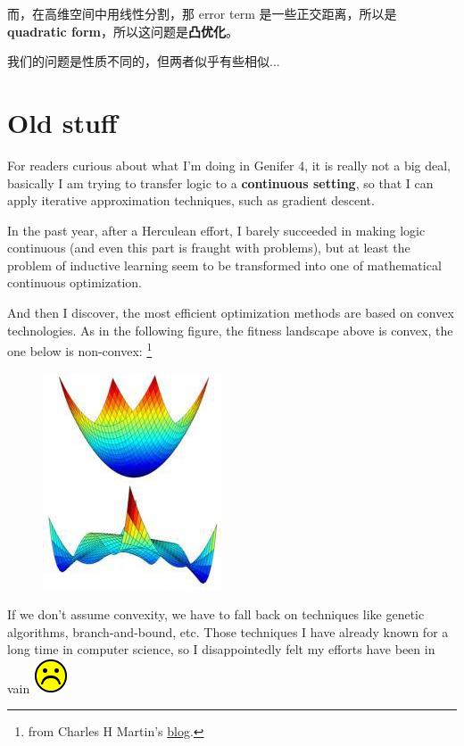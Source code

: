 \documentclass[12pt]{article}
\newcommand*\sadface{\includegraphics[scale=0.25]{face-sad.png}}
\begin{document}
而，在高维空间中用线性分割，那 error term 是一些正交距离，所以是 \textbf{quadratic form}，所以这问题是\textbf{凸优化}。


我们的问题是性质不同的，但两者似乎有些相似... 

\section{Old stuff}

For readers curious about what I'm doing in Genifer 4, it is really not a big deal, basically I am trying to transfer logic to a \textbf{continuous setting}, so that I can apply iterative approximation techniques, such as gradient descent.

In the past year, after a Herculean effort, I barely succeeded in making logic continuous (and even this part is fraught with problems), but at least the problem of inductive learning seem to be transformed into one of mathematical continuous optimization.

And then I discover, the most efficient optimization methods are based on convex technologies.  As in the following figure, the fitness landscape above is convex, the one below is non-convex: \footnote{from Charles H Martin's \href{https://charlesmartin14.wordpress.com/2013/11/14/metric-learning-some-quantum-statistical-mechanics/}{blog}.}
\begin{figure}[H]
\centering
\includegraphics[scale=0.6]{convex-and-nonconvex.jpg}
\end{figure}

If we don't assume convexity, we have to fall back on techniques like genetic algorithms, branch-and-bound, etc.  Those techniques I have already known for a long time in computer science, so I disappointedly felt my efforts have been in vain \sadface
\end{document}
